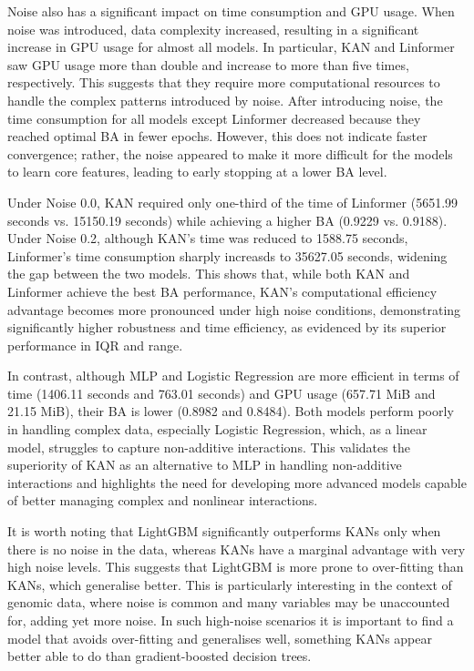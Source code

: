 \documentclass{article}
\begin{document}
Noise also has a significant impact on time consumption and GPU usage. When noise was introduced, data complexity increased, resulting in a significant increase in GPU usage for almost all models. In particular, KAN and Linformer saw GPU usage more than double and increase to more than five times, respectively. This suggests that they require more computational resources to handle the complex patterns introduced by noise. After introducing noise, the time consumption for all models except Linformer decreased because they reached optimal BA in fewer epochs. However, this does not indicate faster convergence; rather, the noise appeared to make it more difficult for the models to learn core features, leading to early stopping at a lower BA level.

Under Noise 0.0, KAN required only one-third of the time of Linformer (5651.99 seconds vs. 15150.19 seconds) while achieving a higher BA (0.9229 vs. 0.9188). Under Noise 0.2, although KAN's time was reduced to 1588.75 seconds, Linformer's time consumption sharply increasds to 35627.05 seconds, widening the gap between the two models. This shows that, while both KAN and Linformer achieve the best BA performance, KAN's computational efficiency advantage becomes more pronounced under high noise conditions, demonstrating significantly higher robustness and time efficiency, as evidenced by its superior performance in IQR and range. 

In contrast, although MLP and Logistic Regression are more efficient in terms of time (1406.11 seconds and 763.01 seconds) and GPU usage (657.71 MiB and 21.15 MiB), their BA is lower (0.8982 and 0.8484). Both models perform poorly in handling complex data, especially Logistic Regression, which, as a linear model, struggles to capture non-additive interactions. This validates the superiority of KAN as an alternative to MLP in handling non-additive interactions and highlights the need for developing more advanced models capable of better managing complex and nonlinear interactions.

It is worth noting that LightGBM significantly outperforms KANs only when there is no noise in the data, whereas KANs have a marginal advantage with very high noise levels.
This suggests that LightGBM is more prone to over-fitting than KANs, which generalise better.
This is particularly interesting in the context of genomic data, where noise is common and many variables may be unaccounted for, adding yet more noise.
In such high-noise scenarios it is important to find a model that avoids over-fitting and generalises well, something KANs appear better able to do than gradient-boosted decision trees.
\end{document}
